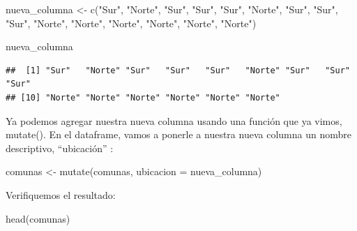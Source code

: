 \documentclass[
]{book}
\newenvironment{Shaded}{\begin{snugshade}}{\end{snugshade}}
\newcommand{\AttributeTok}[1]{\textcolor[rgb]{0.77,0.63,0.00}{#1}}
\newcommand{\FunctionTok}[1]{\textcolor[rgb]{0.00,0.00,0.00}{#1}}
\newcommand{\NormalTok}[1]{#1}
\newcommand{\OtherTok}[1]{\textcolor[rgb]{0.56,0.35,0.01}{#1}}
\newcommand{\StringTok}[1]{\textcolor[rgb]{0.31,0.60,0.02}{#1}}
\begin{document}
\begin{Shaded}
\begin{Highlighting}[]
\NormalTok{nueva\_columna }\OtherTok{\textless{}{-}} \FunctionTok{c}\NormalTok{(}\StringTok{"Sur"}\NormalTok{, }\StringTok{"Norte"}\NormalTok{, }\StringTok{"Sur"}\NormalTok{, }\StringTok{"Sur"}\NormalTok{, }\StringTok{"Sur"}\NormalTok{, }\StringTok{"Norte"}\NormalTok{, }\StringTok{"Sur"}\NormalTok{, }\StringTok{"Sur"}\NormalTok{, }
                   \StringTok{"Sur"}\NormalTok{, }\StringTok{"Norte"}\NormalTok{, }\StringTok{"Norte"}\NormalTok{, }\StringTok{"Norte"}\NormalTok{, }\StringTok{"Norte"}\NormalTok{, }\StringTok{"Norte"}\NormalTok{, }\StringTok{"Norte"}\NormalTok{)}

\NormalTok{nueva\_columna}
\end{Highlighting}
\end{Shaded}

\begin{verbatim}
##  [1] "Sur"   "Norte" "Sur"   "Sur"   "Sur"   "Norte" "Sur"   "Sur"   "Sur"  
## [10] "Norte" "Norte" "Norte" "Norte" "Norte" "Norte"
\end{verbatim}

Ya podemos agregar nuestra nueva columna usando una función que ya vimos, mutate(). En el dataframe, vamos a ponerle a nuestra nueva columna un nombre descriptivo, ``ubicación'' :

\begin{Shaded}
\begin{Highlighting}[]
\NormalTok{comunas }\OtherTok{\textless{}{-}} \FunctionTok{mutate}\NormalTok{(comunas, }\AttributeTok{ubicacion =}\NormalTok{ nueva\_columna)}
\end{Highlighting}
\end{Shaded}

Verifiquemos el resultado:

\begin{Shaded}
\begin{Highlighting}[]
\FunctionTok{head}\NormalTok{(comunas)}
\end{Highlighting}
\end{Shaded}
\end{document}

